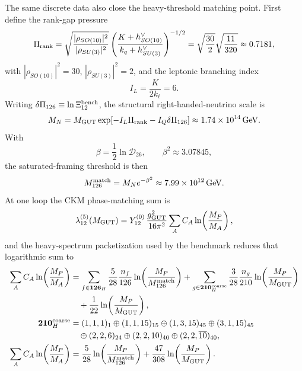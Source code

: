 \documentclass[11pt]{article}
\begin{document}
The same discrete data also close the heavy-threshold matching point. First define the rank-gap pressure
\begin{equation}
 \Pi_{\rm rank}
 =
 \sqrt{\frac{|\rho_{SO(10)}|^2}{|\rho_{SU(3)}|^2}}
 \left(\frac{K+h^{\vee}_{SO(10)}}{k_q+h^{\vee}_{SU(3)}}\right)^{-1/2}
 =
 \sqrt{\frac{30}{2}}\sqrt{\frac{11}{320}}
 \approx 0.7181,
\end{equation}
with $|\rho_{SO(10)}|^2=30$, $|\rho_{SU(3)}|^2=2$, and the leptonic branching index
\begin{equation}
 I_L=\frac{K}{2k_{\ell}}=6.
\end{equation}
Writing $\delta\Pi_{126}\equiv\ln\Xi_{12}^{\rm bench}$, the structural right-handed-neutrino scale is
\begin{equation}
 M_N
 =
 M_{\rm GUT}\exp\!\left[-I_L\Pi_{\rm rank}-I_Q\delta\Pi_{126}\right]
 \approx 1.74\times10^{14}\,\mathrm{GeV}.
\end{equation}
With
\begin{equation}
 \beta=\frac12\ln\mathcal D_{26},
 \qquad
 \beta^2\approx 3.07845,
\end{equation}
the saturated-framing threshold is then
\begin{equation}
 M_{126}^{\rm match}
 =
 M_N e^{-\beta^2}
 \approx 7.99\times10^{12}\,\mathrm{GeV}.
\end{equation}
At one loop the CKM phase-matching sum is
\begin{equation}
 \lambda_{12}^{(5)}(M_{\rm GUT})
 =
 Y_{12}^{(0)}\,\frac{g_{\rm GUT}^2}{16\pi^2}
 \sum_A C_A\ln\!\left(\frac{M_P}{M_A}\right),
\end{equation}
and the heavy-spectrum packetization used by the benchmark reduces that logarithmic sum to
\begin{align}
 \sum_A C_A\ln\!\left(\frac{M_P}{M_A}\right)
 &=
 \sum_{f\in\mathbf{126}_H}
 \frac{5}{28}\frac{n_f}{126}\ln\!\left(\frac{M_P}{M_{126}^{\rm match}}\right)
 +
 \sum_{g\in\mathbf{210}_H^{\rm coarse}}
 \frac{3}{28}\frac{n_g}{210}\ln\!\left(\frac{M_P}{M_{\rm GUT}}\right)
 \notag\\
 &\quad+
 \frac{1}{22}\ln\!\left(\frac{M_P}{M_{\rm GUT}}\right),
 \notag\\
 \mathbf{210}_H^{\rm coarse}
 &=
 (1,1,1)_{1}\oplus(1,1,15)_{15}\oplus(1,3,15)_{45}\oplus(3,1,15)_{45}
 \notag\\
 &\quad\oplus(2,2,6)_{24}\oplus(2,2,10)_{40}\oplus(2,2,\overline{10})_{40},
 \notag\\
 \sum_A C_A\ln\!\left(\frac{M_P}{M_A}\right)
 &=
 \frac{5}{28}\ln\!\left(\frac{M_P}{M_{126}^{\rm match}}\right)
 +
 \frac{47}{308}\ln\!\left(\frac{M_P}{M_{\rm GUT}}\right).
\end{align}
\end{document}

